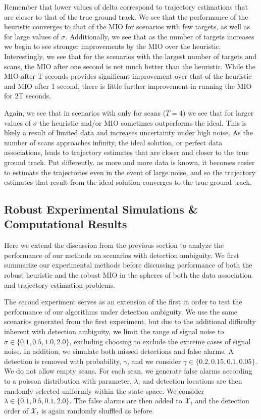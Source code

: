 \documentclass[journal]{IEEEtran}
\begin{document}
Remember that lower values of delta correspond to trajectory estimations that are closer to that of the true ground track. We see that the performance of the heuristic converges to that of the MIO for scenarios with few targets, as well as for large values of $\sigma$. Additionally, we see that as the number of targets increases we begin to see stronger improvements by the MIO over the heuristic. Interestingly, we see that for the scenarios with the largest number of targets and scans, the MIO after one second is not much better than the heuristic. While the MIO after T seconds provides significant improvement over that of the heuristic and MIO after 1 second, there is little further improvement in running the MIO for 2T seconds. 

Again, we see that in scenarios with only for scans ($T=4$) we see that for larger values of $\sigma$ the heuristic and/or MIO sometimes outperforms the ideal. This is likely a result of limited data and increases uncertainty under high noise. As the number of scans approaches infinity, the ideal solution, or perfect data associations, leads to trajectory estimates that are closer and closer to the true ground track. Put differently. as more and more data is known, it becomes easier to estimate the trajectories even in the event of large noise, and so the trajectory estimates that result from the ideal solution converges to the true ground track. 

\subsection{Robust Experimental Simulations \& Computational Results}\label{sec:Robust_Results}
Here we extend the discussion from the previous section to analyze the performance of our methods on scenarios with detection ambiguity. We first summarize our experimental methods before discussing performance of both the robust heuristic and the robust MIO in the spheres of both the data association and trajectory estimation problems.

The second experiment serves as an extension of the first in order to test the performance of our algorithms under detection ambiguity. We use the same scenarios generated from the first experiment, but due to the additional difficulty inherent with detection ambiguity, we limit the range of signal noise to $\sigma \in \{0.1,0.5,1.0,2.0\}$, excluding choosing to exclude the extreme cases of signal noise. In addition, we simulate both missed detections and false alarms. A detection is removed with probability, $\gamma$, and we consider $\gamma \in \{0.2,0.15,0.1,0.05\}$. We do not allow empty scans. For each scan, we generate false alarms according to a poisson distribution with parameter, $\lambda$, and detection locations are then randomly selected uniformly within the state space. We consider $\lambda \in \{0.1,0.5,0.1,2.0\}$. The false alarms are then added to $\mathcal{X}_{t}$ and the detection order of $\mathcal{X}_{t}$ is again randomly shuffled as before. 
\end{document}
